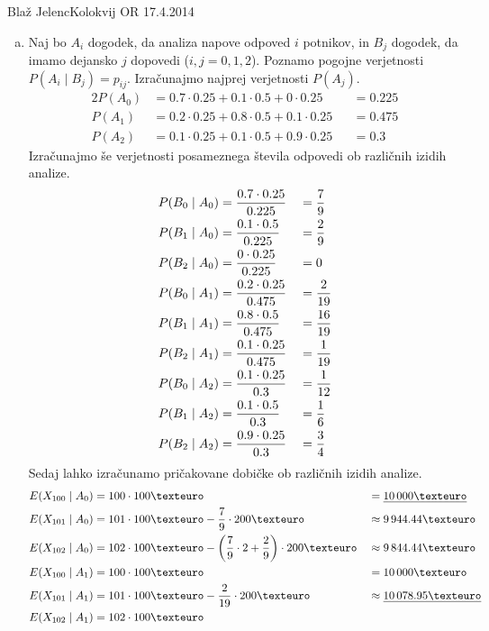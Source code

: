 \begin{naloga}{Blaž Jelenc}{Kolokvij OR 17.4.2014}
\begin{odgovor}
\begin{enumerate}[(a)]
\item Naj bo $A_i$ dogodek, da analiza napove odpoved $i$ potnikov,
in $B_j$ dogodek, da imamo dejansko $j$ dopovedi ($i, j = 0, 1, 2$).
Poznamo pogojne verjetnosti $P(A_i \;|\; B_j) = p_{ij}$.
Izračunajmo najprej verjetnosti $P(A_j)$.
\begin{alignat*}{2}
P(A_0) &= 0.7 \cdot 0.25 + 0.1 \cdot 0.5 + 0 \cdot 0.25 &&= 0.225 \\
P(A_1) &= 0.2 \cdot 0.25 + 0.8 \cdot 0.5 + 0.1 \cdot 0.25 &&= 0.475 \\
P(A_2) &= 0.1 \cdot 0.25 + 0.1 \cdot 0.5 + 0.9 \cdot 0.25 &&= 0.3
\end{alignat*}
Izračunajmo še verjetnosti posameznega števila odpovedi
ob različnih izidih analize.
\begin{alignat*}{2}
P(B_0 \;|\; A_0) &= {0.7 \cdot 0.25 \over 0.225} &&= {7 \over 9} \\
P(B_1 \;|\; A_0) &= {0.1 \cdot 0.5 \over 0.225} &&= {2 \over 9} \\
P(B_2 \;|\; A_0) &= {0 \cdot 0.25 \over 0.225} &&= 0 \\
P(B_0 \;|\; A_1) &= {0.2 \cdot 0.25 \over 0.475} &&= {2 \over 19} \\
P(B_1 \;|\; A_1) &= {0.8 \cdot 0.5 \over 0.475} &&= {16 \over 19} \\
P(B_2 \;|\; A_1) &= {0.1 \cdot 0.25 \over 0.475} &&= {1 \over 19} \\
P(B_0 \;|\; A_2) &= {0.1 \cdot 0.25 \over 0.3} &&= {1 \over 12} \\
P(B_1 \;|\; A_2) &= {0.1 \cdot 0.5 \over 0.3} &&= {1 \over 6} \\
P(B_2 \;|\; A_2) &= {0.9 \cdot 0.25 \over 0.3} &&= {3 \over 4}
\end{alignat*}
Sedaj lahko izračunamo pričakovane dobičke ob različnih izidih analize.
\begin{alignat*}{2}
E(X_{100} \;|\; A_0) &= 100 \cdot 100 € &&= \underline{10\,000 €} \\
E(X_{101} \;|\; A_0) &= 101 \cdot 100 € - {7 \over 9} \cdot 200 €
&&\approx 9\,944.44 € \\
E(X_{102} \;|\; A_0) &= 102 \cdot 100 €
- \left({7 \over 9} \cdot 2 + {2 \over 9}\right) \cdot 200 €
&&\approx 9\,844.44 € \\
E(X_{100} \;|\; A_1) &= 100 \cdot 100 € &&= 10\,000 € \\
E(X_{101} \;|\; A_1) &= 101 \cdot 100 € - {2 \over 19} \cdot 200 €
&&\approx \underline{10\,078.95 €} \\
E(X_{102} \;|\; A_1) &= 102 \cdot 100 €

\end{alignat*}
\end{enumerate}
\end{odgovor}
\end{naloga}
